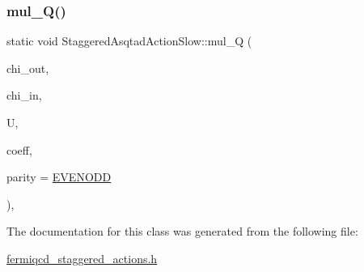 \subsubsection{\texorpdfstring{mul\+\_\+\+Q()}{mul\_Q()}}
{\footnotesize\ttfamily static void Staggered\+Asqtad\+Action\+Slow\+::mul\+\_\+Q (\begin{DoxyParamCaption}\item[{\hyperlink{classstaggered__field}{staggered\+\_\+field} \&}]{chi\+\_\+out,  }\item[{\hyperlink{classstaggered__field}{staggered\+\_\+field} \&}]{chi\+\_\+in,  }\item[{\hyperlink{classgauge__field}{gauge\+\_\+field} \&}]{U,  }\item[{\hyperlink{classcoefficients}{coefficients} \&}]{coeff,  }\item[{int}]{parity = {\ttfamily \hyperlink{mdp__global__vars_8h_a4c9de81f2de5a74b588107b6c0afb9ee}{E\+V\+E\+N\+O\+DD}} }\end{DoxyParamCaption})\hspace{0.3cm}{\ttfamily [inline]}, {\ttfamily [static]}}



The documentation for this class was generated from the following file\+:\begin{DoxyCompactItemize}
\item 
\hyperlink{fermiqcd__staggered__actions_8h}{fermiqcd\+\_\+staggered\+\_\+actions.\+h}\end{DoxyCompactItemize}
